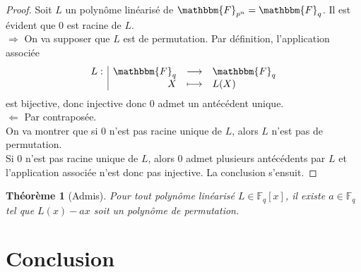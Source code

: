 \documentclass[12pt]{article}
\newcommand{\Fq}{\mathbbm{F}_q}
\newcommand{\fonction}[5]{
\begin{displaymath}
\begin{array}{l|rcl}
\displaystyle
#1 : & #2 & \longrightarrow & #3 \\
    & #4 & \longmapsto & #5
\end{array}
\end{displaymath}
}
\newtheorem{theorem}{Théorème}
\theoremstyle{definition}
\begin{document}
\begin{proof}
Soit $L$ un polynôme linéarisé de $\mathbbm{F}_{p^n} = \Fq$. Il est évident que $0$ est racine de $L$.\\
$\Rightarrow$ On va supposer que $L$ est de permutation. Par définition, l'application associée \fonction{L}{\Fq}{\Fq}{X}{L(X)} est bijective, donc injective donc $0$ admet un antécédent unique.\\

$\Leftarrow$ Par contraposée.\\
On va montrer que si $0$ n'est pas racine unique de $L$, alors $L$ n'est pas de permutation.\\
Si $0$ n'est pas racine unique de $L$, alors $0$ admet plusieurs antécédents par $L$ et l'application associée n'est donc pas injective. La conclusion s'ensuit.
\end{proof}

\begin{theorem}[Admis]
Pour tout polynôme linéarisé $L \in \mathbb{F}_q[x]$, il existe $a \in \mathbb{F}_q$ tel que $L(x) - ax$ soit un polynôme de permutation.
\end{theorem}



\pagebreak

\section*{Conclusion}
\end{document}

